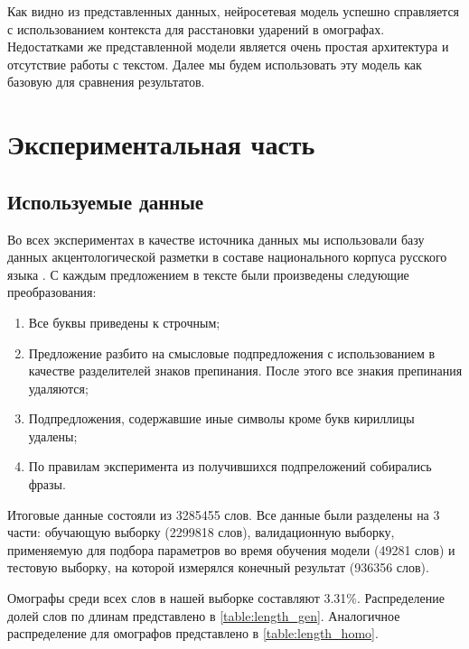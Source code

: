 \documentclass[14pt, a4paper, russian]{extreport}
\begin{document}
Как видно из представленных данных, нейросетевая модель успешно справляется с использованием контекста для расстановки ударений в омографах. Недостатками же представленной модели является очень простая архитектура и отсутствие работы с текстом. Далее мы будем использовать эту модель как базовую для сравнения результатов. 


\newpage
\chapter{Экспериментальная часть}
\section{Используемые данные}
\label{prepare}

Во всех экспериментах в качестве источника данных мы использовали базу данных акцентологической разметки в составе национального корпуса русского языка \cite{grishina}. С каждым предложением в тексте были произведены следующие преобразования:
\begin{enumerate}[  1{)} ]
	\item Все буквы приведены к строчным;
	\item Предложение разбито на смысловые подпредложения с использованием  в качестве разделителей знаков препинания. После этого все знакия препинания удаляются;
	\item Подпредложения, содержавшие  иные символы кроме букв  кириллицы удалены;
	\item По правилам эксперимента из получившихся подпреложений собирались фразы.
\end{enumerate}

Итоговые данные состояли из 3285455  слов. Все данные были разделены на 3 части: обучающую выборку (2299818 слов), валидационную выборку, применяемую для подбора параметров во время обучения модели (49281 слов) и тестовую  выборку, на которой измерялся конечный результат (936356 слов).

Омографы среди всех слов в нашей выборке составляют 3.31\%. Распределение долей слов по длинам представлено в \cref{table:length_gen}. Аналогичное распределение для омографов представлено в \cref{table:length_homo}.
\end{document}
